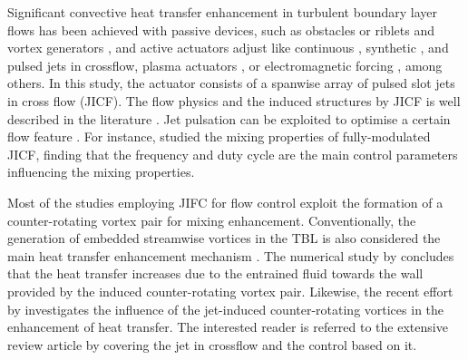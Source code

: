 Significant convective heat transfer enhancement in turbulent boundary layer flows has been achieved with passive devices, such as obstacles \citep{mallor2018cubes} or riblets \citep{mallor2019modal} and vortex generators \citep{Ke2019VG}, and active actuators adjust like continuous \citep{puzu2019jet}, synthetic \citep{Giachetti2018synjet}, and pulsed \citep{Castellanos2022slotjet} jets in crossflow, plasma actuators \citep{roy2008plasma}, or electromagnetic forcing \citep{Kenjere2008EMheat}, among others. In this study, the actuator consists of a spanwise array of pulsed slot jets in cross flow (JICF).  The flow physics and the induced structures by JICF is well described in the literature \citep[e.g.][]{cortelezzi2001formation, Getsinger2014}. Jet pulsation can be exploited to optimise a certain flow feature \citep{eroglu2001structure, MCLOSKEY2002, shapiro2006optimization}. For instance, \citet{johari1999penetration} studied the mixing properties of fully-modulated JICF, finding that the frequency and duty cycle are the main control parameters influencing the mixing properties. 

Most of the studies employing JIFC for flow control exploit the formation of a counter-rotating vortex pair for mixing enhancement. Conventionally, the generation of embedded streamwise vortices in the TBL is also considered the main heat transfer enhancement mechanism \citep{jacobi1995}. The numerical study by \citet{Zhang1993heatJICF} concludes that the heat transfer increases due to the entrained fluid towards the wall provided by the induced counter-rotating vortex pair. Likewise, the recent effort by \citet{puzu2019jet} investigates the influence of the jet-induced counter-rotating vortices in the enhancement of heat transfer. The interested reader is referred to the extensive review article by \citet{karagozian2010transverse} covering the jet in crossflow and the control based on it. 


